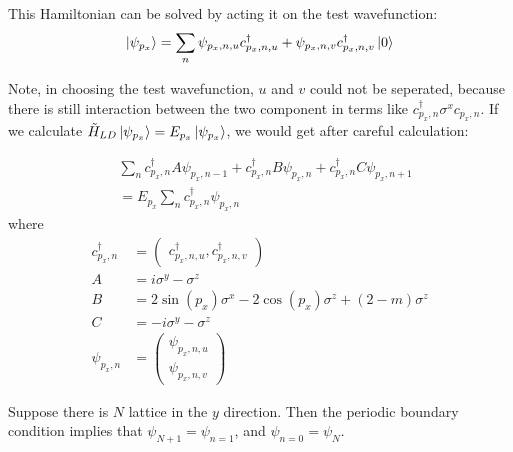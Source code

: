\documentclass{article}
\begin{document}
This Hamiltonian can be solved by acting it on the test wavefunction:
\begin{equation}
    \ket{\psi_{p_x}} = \sum_n \psi_{p_x,n,u} c^\dagger_{p_x,n,u} +
                        \psi_{p_x,n,v} c^\dagger_{p_x,n,v} \ket{0}
\end{equation}

Note, in choosing the test wavefunction, $u$ and $v$ could not be
seperated, because there is still interaction between the two
component in terms like $c^\dagger_{p_x,n}\sigma^x c_{p_x,n}$.
If we calculate $\tilde H_{LD}\ket{\psi_{p_x}} = E_{p_x}
\ket{\psi_{p_x}}$, we would get after careful calculation:

\begin{align}
    & \sum_n
    c^\dagger_{p_x,n} A   \psi_{p_x,n-1}
    + c^\dagger_{p_x,n} B \psi_{p_x,n} 
    + c^\dagger_{p_x,n} C \psi_{p_x,n+1}
    \nonumber\\
    &= E_{p_x} \sum_n c^\dagger_{p_x,n}\psi_{p_x,n}
\end{align}
where
\begin{align}
    c^\dagger_{p_x,n} &= \begin{pmatrix}
        c^\dagger_{p_x,n,u},  c^\dagger_{p_x,n,v}
    \end{pmatrix} \\
    A &= i\sigma^y - \sigma^z \\
    B &= 2\sin(p_x)\sigma^x - 2\cos(p_x)\sigma^z + (2-m)\sigma^z \\
    C &= -i\sigma^y - \sigma^z \\
    \psi_{p_x,n} &= \begin{pmatrix}
        \psi_{p_x,n,u} \\ \psi_{p_x,n,v}
    \end{pmatrix}
\end{align}

Suppose there is $N$ lattice in the $y$ direction. Then the periodic
boundary condition implies that $\psi_{N+1}=\psi_{n=1}$, and
$\psi_{n=0} = \psi_N$.
\end{document}
